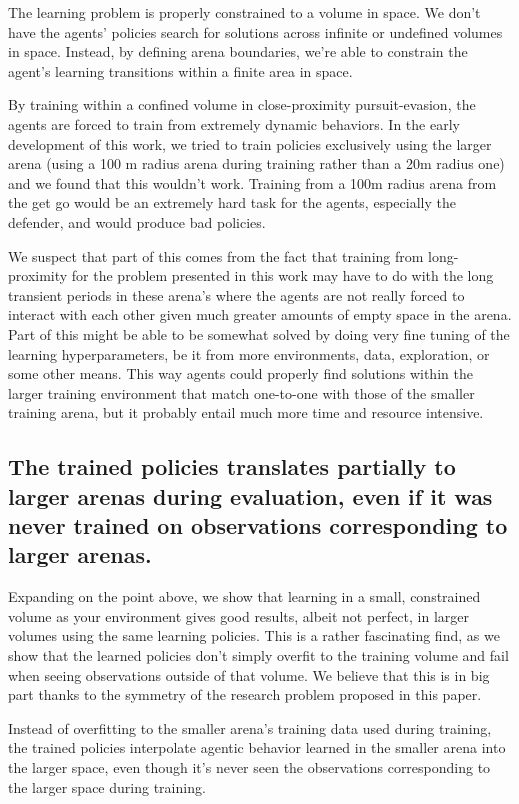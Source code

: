 The learning problem is properly constrained to a volume in space. We don't have the agents' policies search for solutions across infinite or undefined volumes in space. Instead, by defining arena boundaries, we're able to constrain the agent's learning transitions within a finite area in space.

By training within a confined volume in close-proximity pursuit-evasion, the agents are forced to train from extremely dynamic behaviors. In the early development of this work, we tried to train policies exclusively using the larger arena (using a 100 m radius arena during training rather than a 20m radius one) and we found that this wouldn't work. Training from a 100m radius arena from the get go would be an extremely hard task for the agents, especially the defender, and would produce bad policies.

We suspect that part of this comes from the fact that training from long-proximity for the problem presented in this work may have to do with the long transient periods in these arena's where the agents are not really forced to interact with each other given much greater amounts of empty space in the arena. Part of this might be able to be somewhat solved by doing very fine tuning of the learning hyperparameters, be it from more environments, data, exploration, or some other means. This way agents could properly find solutions within the larger training environment that match one-to-one with those of the smaller training arena, but it probably entail much more time and resource intensive.



\subsection*{The trained policies  translates partially to larger arenas during evaluation, even if it was never trained on observations corresponding to larger arenas.}


Expanding on the point above, we show that learning in a small, constrained volume as your environment gives good results, albeit not perfect, in larger volumes using the same learning policies. This is a rather fascinating find, as we show that the learned policies don't simply overfit to the training volume and fail when seeing observations outside of that volume. We believe that this is in big part thanks to the symmetry of the research problem proposed in this paper.

Instead of overfitting to the smaller arena's training data used during training, the trained policies interpolate agentic behavior learned in the smaller arena into the larger space, even though it's never seen the observations corresponding to the larger space during training.

